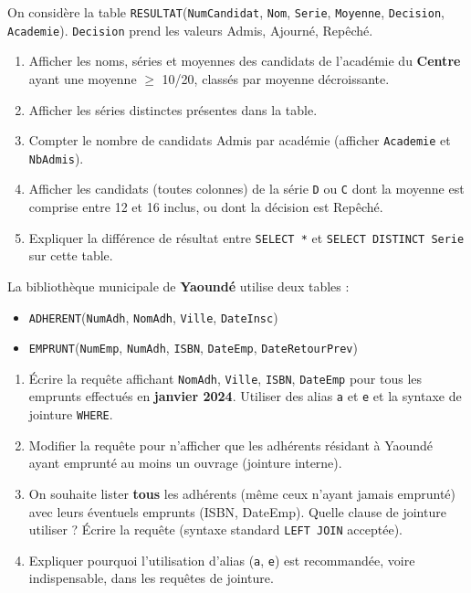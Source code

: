 \documentclass[11pt]{article}
\begin{document}
\begin{exercice}
On considère la table \texttt{RESULTAT}(\texttt{NumCandidat}, \texttt{Nom}, \texttt{Serie}, \texttt{Moyenne}, \texttt{Decision}, \texttt{Academie}). \texttt{Decision} prend les valeurs \og{}Admis\fg{}, \og{}Ajourné\fg{}, \og{}Repêché\fg{}.
\begin{enumerate}
    \item Afficher les noms, séries et moyennes des candidats de l'académie du \textbf{Centre} ayant une moyenne $\ge$ 10/20, classés par moyenne décroissante.
    \item Afficher les séries distinctes présentes dans la table.
    \item Compter le nombre de candidats \og{}Admis\fg{} par académie (afficher \texttt{Academie} et \texttt{NbAdmis}).
    \item Afficher les candidats (toutes colonnes) de la série \texttt{D} ou \texttt{C} dont la moyenne est comprise entre 12 et 16 inclus, ou dont la décision est \og{}Repêché\fg{}.
    \item Expliquer la différence de résultat entre \texttt{SELECT *} et \texttt{SELECT DISTINCT Serie} sur cette table.
\end{enumerate}
\end{exercice}

\begin{exercice}
La bibliothèque municipale de \textbf{Yaoundé} utilise deux tables :
\begin{itemize}
    \item \texttt{ADHERENT}(\texttt{NumAdh}, \texttt{NomAdh}, \texttt{Ville}, \texttt{DateInsc})
    \item \texttt{EMPRUNT}(\texttt{NumEmp}, \texttt{NumAdh}, \texttt{ISBN}, \texttt{DateEmp}, \texttt{DateRetourPrev})
\end{itemize}
\begin{enumerate}
    \item Écrire la requête affichant \texttt{NomAdh}, \texttt{Ville}, \texttt{ISBN}, \texttt{DateEmp} pour tous les emprunts effectués en \textbf{janvier 2024}. Utiliser des alias \texttt{a} et \texttt{e} et la syntaxe de jointure \texttt{WHERE}.
    \item Modifier la requête pour n'afficher que les adhérents résidant à \og{}Yaoundé\fg{} ayant emprunté au moins un ouvrage (jointure interne).
    \item On souhaite lister \textbf{tous} les adhérents (même ceux n'ayant jamais emprunté) avec leurs éventuels emprunts (ISBN, DateEmp). Quelle clause de jointure utiliser ? Écrire la requête (syntaxe standard \texttt{LEFT JOIN} acceptée).
    \item Expliquer pourquoi l'utilisation d'alias (\texttt{a}, \texttt{e}) est recommandée, voire indispensable, dans les requêtes de jointure.
\end{enumerate}
\end{exercice}
\end{document}
